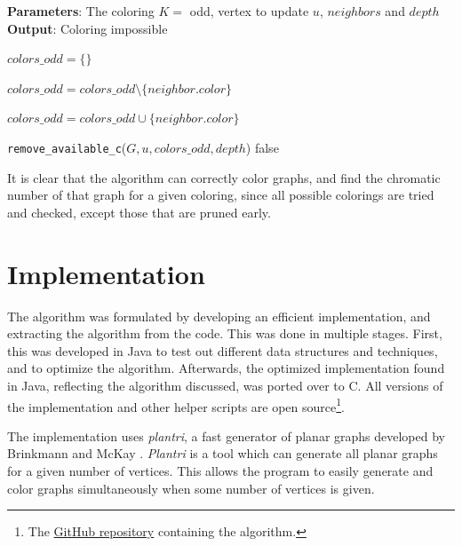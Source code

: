 \documentclass{article}
\begin{document}
\begin{algorithm}[tb]
	\caption{\texttt{handle\_special\_case\_odd}}
	\label{alg:special}
	\textbf{Parameters}: The coloring $K = $ odd, vertex to update $u$, $neighbors$ and $depth$ \\
	\textbf{Output}: Coloring impossible
	\begin{algorithmic}[1]
		\STATE $colors\_odd = \{\}$
		
		
		\STATE $colors\_odd = colors\_odd \setminus \{neighbor.color\}$
		
		\ELSE 
		
		\STATE $colors\_odd = colors\_odd \cup \{neighbor.color\}$
		\ENDIF
		
		\ENDFOR
		
		
		\RETURN \texttt{remove\_available\_c}($G, u, colors\_odd, depth$)
		\ENDIF
		\RETURN false
	\end{algorithmic}
\end{algorithm}

It is clear that the algorithm can correctly color graphs, and find the chromatic number of that graph for a given coloring, since all possible colorings are tried and checked, except those that are pruned early.

\section{Implementation}
\label{sec:implementation}

The algorithm was formulated by developing an efficient implementation, and extracting the algorithm from the code. This was done in multiple stages. First, this was developed in Java to test out different data structures and techniques, and to optimize the algorithm. Afterwards, the optimized implementation found in Java, reflecting the algorithm discussed, was ported over to C. All versions of the implementation and other helper scripts are open source\footnote{The \href{https://github.com/ArneClaerhout/color_planar_graphs}{GitHub repository} containing the algorithm.}.

The implementation uses \textit{plantri}, a fast generator of planar graphs developed by Brinkmann and McKay \cite{brinkmann2007fast}. \textit{Plantri} is a tool which can generate all planar graphs for a given number of vertices. This allows the program to easily generate and color graphs simultaneously when some number of vertices is given. 
\end{document}
